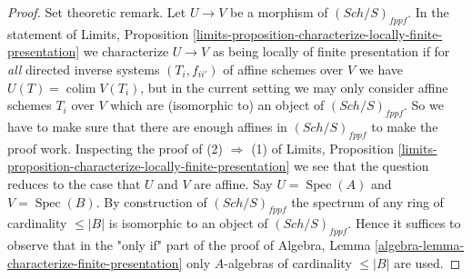 \documentclass{stacks-project}
\theoremstyle{plain}
\theoremstyle{definition}
\theoremstyle{remark}
\numberwithin{equation}{subsection}
\def\colim{\mathop{\mathrm{colim}}\nolimits}
\def\Spec{\mathop{\mathrm{Spec}}}
\def\Sch{\mathit{Sch}}
\begin{document}
\begin{proof}
\medskip\noindent
Set theoretic remark. Let $U \to V$ be a morphism of
$(\Sch/S)_{fppf}$. In the statement of
Limits, Proposition
\ref{limits-proposition-characterize-locally-finite-presentation}
we characterize $U \to V$ as being locally of finite presentation
if for {\it all} directed inverse systems $(T_i, f_{ii'})$ of affine schemes
over $V$ we have $U(T) = \colim V(T_i)$, but in the current setting
we may only consider affine schemes $T_i$ over $V$ which are (isomorphic to)
an object of $(\Sch/S)_{fppf}$. So we have to make sure that there
are enough affines in $(\Sch/S)_{fppf}$ to make the proof work.
Inspecting the proof of (2) $\Rightarrow$ (1) of
Limits, Proposition
\ref{limits-proposition-characterize-locally-finite-presentation}
we see that the question reduces to the case that $U$ and $V$ are affine.
Say $U = \Spec(A)$ and $V = \Spec(B)$. By construction
of $(\Sch/S)_{fppf}$ the spectrum of any ring of cardinality
$\leq |B|$ is isomorphic to an object of $(\Sch/S)_{fppf}$.
Hence it suffices to observe that in the "only if" part of the proof of
Algebra, Lemma \ref{algebra-lemma-characterize-finite-presentation}
only $A$-algebras of cardinality $\leq |B|$ are used.
\end{proof}
\end{document}
